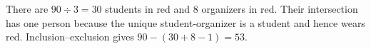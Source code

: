 There are $90\div3=30$ students in red and 8 organizers in red. Their intersection has one person because the unique student-organizer is a student and hence wears red. Inclusion--exclusion gives $90-(30+8-1)=\boxed{53}$.
